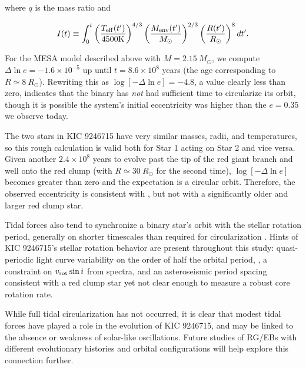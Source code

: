\noindent where $q$ is the mass ratio and

\begin{equation}
I(t) \equiv \int_0^t \left( \frac{T_{\rm{eff}}(t')}{4500 \rm{K}} \right)^{4/3} \left( \frac{M_{\rm{env}}(t')}{M_{\odot}} \right)^{2/3} \left( \frac{R(t')}{R_{\odot}} \right)^8 dt'. \nonumber
\end{equation}

For the MESA model described above with $M = 2.15 \ M_{\odot}$, we compute $\Delta \ln e = -1.6 \times 10^{-5}$ up until $t = 8.6 \times 10^8$ years (the age corresponding to $R \simeq 8 \ R_{\odot}$). Rewriting this as $\log [-\Delta \ln e] = -4.8$, a value clearly less than zero, indicates that the binary has \emph{not} had sufficient time to circularize its orbit, though it is possible the system's initial eccentricity was higher than the $e = 0.35$ we observe today.

The two stars in KIC 9246715 have very similar masses, radii, and temperatures, so this rough calculation is valid both for Star 1 acting on Star 2 and vice versa. Given another $2.4 \times 10^8$ years to evolve past the tip of the red giant branch and well onto the red clump (with $R \simeq 30 \ R_\odot$ for the second time), $\log [-\Delta \ln e]$ becomes greater than zero and the expectation is a circular orbit. Therefore, the observed eccentricity is consistent with , but not with a significantly older and larger red clump star.

Tidal forces also tend to synchronize a binary star's orbit with the stellar rotation period, generally on shorter timescales than required for circularization \citep{ogi14}. Hints of KIC 9246715's stellar rotation behavior are present throughout this study: quasi-periodic light curve variability on the order of half the orbital period, , a constraint on $v_{\rm{rot}} \sin i$ from spectra, and an asteroseismic period spacing consistent with a red clump star yet not clear enough to measure a robust core rotation rate.

While full tidal circularization has not occurred, it is clear that modest tidal forces have played a role in the evolution of KIC 9246715, and may be linked to the absence or weakness of solar-like oscillations. Future studies of RG/EBs with different evolutionary histories and orbital configurations will help explore this connection further.

  
  